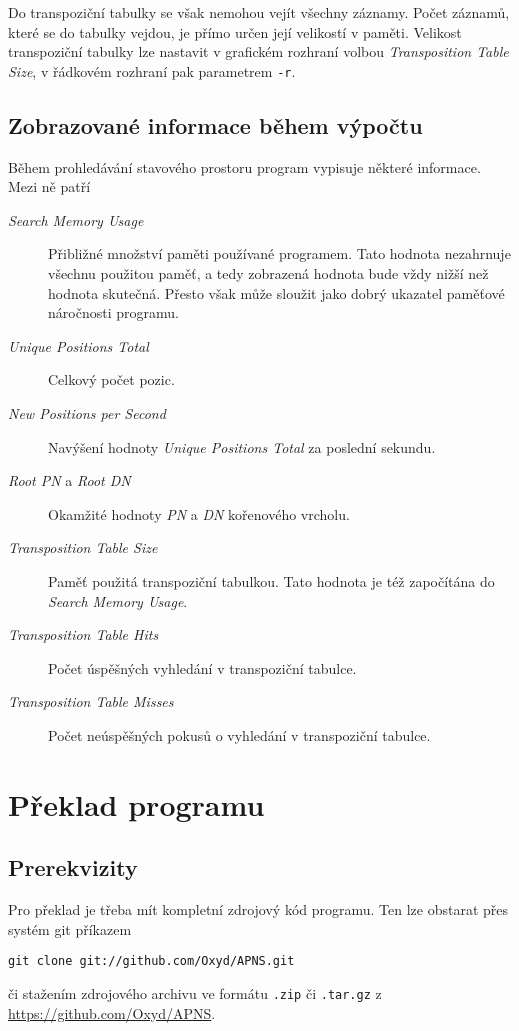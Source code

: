 \documentclass{article}
\begin{document}
Do transpoziční tabulky se však nemohou vejít všechny záznamy. Počet záznamů, které se do tabulky vejdou, je přímo určen
její velikostí v paměti. Velikost transpoziční tabulky lze nastavit v grafickém rozhraní volbou \emph{Transposition
Table Size}, v řádkovém rozhraní pak parametrem \texttt{-r}.

\subsection{Zobrazované informace během výpočtu}
Během prohledávání stavového prostoru program vypisuje některé informace. Mezi ně patří \begin{description}
\item[\emph{Search Memory Usage}] Přibližné množství paměti používané programem. Tato hodnota nezahrnuje všechnu
použitou paměť, a tedy zobrazená hodnota bude vždy nižší než hodnota skutečná. Přesto však může sloužit jako dobrý
ukazatel paměťové náročnosti programu.
\item[\emph{Unique Positions Total}] Celkový počet pozic.
\item[\emph{New Positions per Second}] Navýšení hodnoty \emph{Unique Positions Total} za poslední sekundu.
\item[\emph{Root PN} a \emph{Root DN}] Okamžité hodnoty \emph{PN} a \emph{DN} kořenového vrcholu.
\item[\emph{Transposition Table Size}] Paměť použitá transpoziční tabulkou. Tato hodnota je též započítána do
\emph{Search Memory Usage}.
\item[\emph{Transposition Table Hits}] Počet úspěšných vyhledání v transpoziční tabulce.
\item[\emph{Transposition Table Misses}] Počet neúspěšných pokusů o vyhledání v transpoziční tabulce.
\end{description}

\section{Překlad programu}
\label{sec:compiling}

\subsection{Prerekvizity}
Pro překlad je třeba mít kompletní zdrojový kód programu. Ten lze obstarat přes systém git příkazem
\begin{center}\verb+git clone git://github.com/Oxyd/APNS.git+\end{center} či stažením zdrojového archivu ve formátu
\texttt{.zip} či \texttt{.tar.gz} z \url{https://github.com/Oxyd/APNS}.
\end{document}
